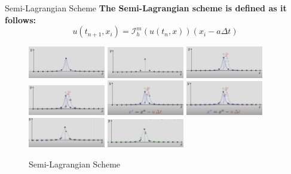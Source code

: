 \begin{frame}{Semi-Lagrangian Scheme}
    \textbf{The Semi-Lagrangian scheme is defined as it follows:}
    \centering
    \begin{equation*}
        u\left(t_{n+1}, x_i\right)=\mathcal{I}_h^m\left(u\left(t_n, x\right)\right)\left(x_i-a \Delta t\right)
    \end{equation*}
    \begin{figure}
        \centering
        \includegraphics[width=0.3\textwidth]{images/semil1.png}
        \includegraphics[width=0.3\textwidth]{images/semil2.png}
        \includegraphics[width=0.3\textwidth]{images/semil2.1.png}
        \includegraphics[width=0.3\textwidth]{images/semil3.png}
        \includegraphics[width=0.3\textwidth]{images/semil4.png}
        \includegraphics[width=0.3\textwidth]{images/semil5.png}
        \includegraphics[width=0.3\textwidth]{images/semil6.png}
        \includegraphics[width=0.3\textwidth]{images/semil7.png}
        \caption{Semi-Lagrangian Scheme}
    \end{figure}

\end{frame}
